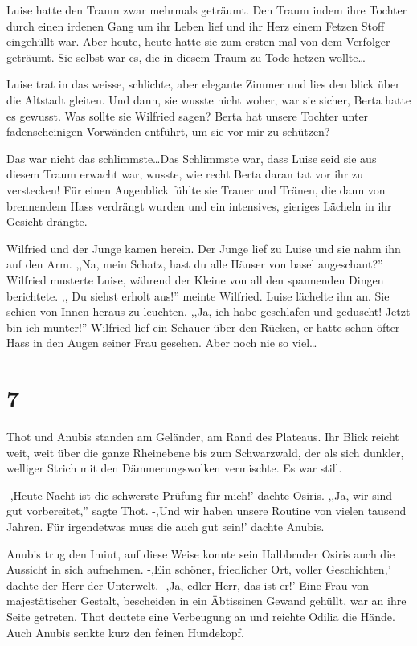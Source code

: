 Luise hatte den Traum zwar mehrmals geträumt. Den Traum indem ihre Tochter durch einen irdenen Gang um ihr Leben lief und ihr Herz einem Fetzen Stoff eingehüllt war. Aber heute, heute hatte sie zum ersten mal von dem Verfolger geträumt. Sie selbst war es, die \am in diesem Traum zu Tode hetzen wollte\dots

Luise trat in das weisse, schlichte, aber elegante Zimmer und lies den blick über die Altstadt gleiten. Und dann, sie wusste nicht woher, war sie sicher, Berta hatte es gewusst. Was sollte sie Wilfried sagen? Berta hat unsere Tochter unter fadenscheinigen Vorwänden entführt, um sie vor mir zu schützen?

Das war nicht das schlimmste\dots Das Schlimmste war, dass Luise seid sie aus diesem Traum erwacht war, wusste, wie recht Berta daran tat \am vor ihr zu verstecken! Für einen Augenblick fühlte sie Trauer und Tränen, die dann von brennendem Hass verdrängt wurden und ein intensives, gieriges Lächeln in ihr Gesicht drängte.

Wilfried und der Junge kamen herein. Der Junge lief zu Luise und sie nahm ihn auf den Arm. ,,Na, mein Schatz, hast du alle Häuser von basel angeschaut?'' Wilfried musterte Luise, während der Kleine von all den spannenden Dingen berichtete. ,, Du siehst erholt aus!'' meinte Wilfried. Luise lächelte ihn an. Sie schien von Innen heraus zu leuchten. ,,Ja, ich habe geschlafen und geduscht! Jetzt bin ich munter!'' Wilfried lief ein Schauer über den Rücken, er hatte schon öfter Hass in den Augen seiner Frau gesehen. Aber noch nie so viel\dots

\section*{7}

Thot und Anubis standen am Geländer, am Rand des Plateaus. Ihr Blick reicht weit, weit über die ganze Rheinebene bis zum Schwarzwald, der als sich dunkler, welliger Strich mit den Dämmerungswolken vermischte. Es war still. 

-,Heute Nacht ist die schwerste Prüfung für mich!' dachte Osiris. ,,Ja, wir sind gut vorbereitet,'' sagte Thot. -,Und wir haben unsere Routine von vielen tausend Jahren. Für irgendetwas muss die auch gut sein!' dachte Anubis.

Anubis trug den Imiut, auf diese Weise konnte sein Halbbruder Osiris auch die Aussicht in sich aufnehmen. -,Ein schöner, friedlicher Ort, voller Geschichten,' dachte der Herr der Unterwelt. -,Ja, edler Herr, das ist er!' Eine Frau von majestätischer Gestalt, bescheiden in ein Äbtissinen Gewand gehüllt, war an ihre Seite getreten. Thot deutete eine Verbeugung an und reichte Odilia die Hände. Auch Anubis senkte kurz den feinen Hundekopf. 

